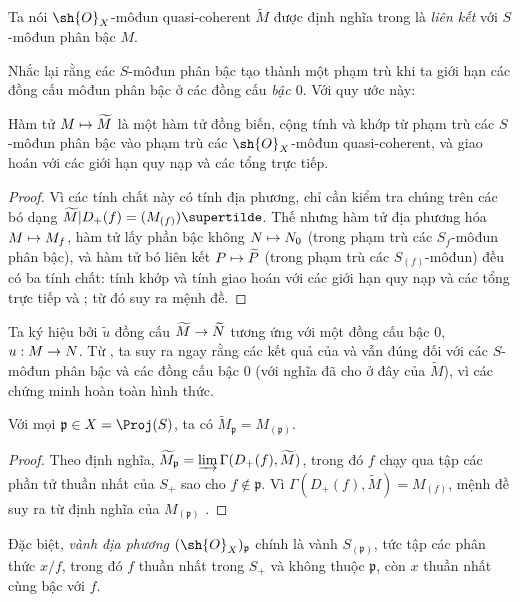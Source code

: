 \documentclass[oneside,10pt]{amsart}
\makeatletter
\newcommand{\ega@arrow}[2]{\mathchoice{#1}{#2}{#2}{#2}}
\let\ega@shortmapsto\mapsto
\renewcommand{\to}{\ega@arrow{\longrightarrow}{\rightarrow}}
\renewcommand{\mapsto}{\ega@arrow{\longmapsto}{\ega@shortmapsto}}
\newcommand{\oldpage}[2][]{\marginnote{\normalfont\footnotesize\textbf{#1}~|~#2}\ignorespaces}
\let\EGAOriginalLabel\label
\renewcommand{\label}[1]{\phantomsection\EGAOriginalLabel{#1}}
\makeatother
\begin{document}
\begin{definition}[2.5.3]
\label{II.2.5.3}
Ta nói $\sh{O}_X$-môđun quasi-coherent $\widetilde{M}$ được định nghĩa trong  là \emph{liên kết} với $S$-môđun phân bậc $M$.
\end{definition}

Nhắc lại rằng các $S$-môđun phân bậc tạo thành một phạm trù khi ta giới hạn các đồng cấu môđun phân bậc ở các đồng cấu \emph{bậc $0$}.
Với quy ước này:

\begin{proposition}[2.5.4]
\label{II.2.5.4}
Hàm tử $M\mapsto\widetilde{M}$ là một hàm tử đồng biến, cộng tính và khớp từ phạm trù các $S$-môđun phân bậc vào phạm trù các $\sh{O}_X$-môđun quasi-coherent, và giao hoán với các giới hạn quy nạp và các tổng trực tiếp.
\end{proposition}

\begin{proof}
Vì các tính chất này có tính địa phương, chỉ cần kiểm tra chúng trên các bó dạng $\widetilde{M}|D_+(f)=(M_{(f)})\supertilde$.
Thế nhưng hàm tử địa phương hóa $M\mapsto M_f$, hàm tử lấy phần bậc không $N\mapsto N_0$ (trong phạm trù các $S_f$-môđun phân bậc), và hàm tử bó liên kết $P\mapsto\widetilde{P}$ (trong phạm trù các $S_{(f)}$-môđun) đều có ba tính chất: tính khớp và tính giao hoán với các giới hạn quy nạp và các tổng trực tiếp  và ; từ đó suy ra mệnh đề.
\end{proof}

Ta ký hiệu bởi $\widetilde{u}$ đồng cấu $\widetilde{M}\to\widetilde{N}$ tương ứng với một đồng cấu bậc $0$, $u:M\to N$.
Từ , ta suy ra ngay rằng các kết quả của  và  vẫn đúng đối với các $S$-môđun phân bậc và các đồng cấu bậc $0$ (với nghĩa đã cho ở đây của $\widetilde{M}$), vì các chứng minh hoàn toàn hình thức.

\begin{proposition}[2.5.5]
\label{II.2.5.5}
Với mọi $\mathfrak{p}\in X=\Proj(S)$, ta có $\widetilde{M}_\mathfrak{p}=M_{(\mathfrak{p})}$.
\end{proposition}

\begin{proof}
Theo định nghĩa, $\widetilde{M}_\mathfrak{p}=\varinjlim\Gamma(D_+(f),\widetilde{M})$, trong đó $f$ chạy qua tập các phần tử thuần nhất của $S_+$ sao cho $f\notin\mathfrak{p}$.
Vì $\Gamma(D_+(f),\widetilde{M})=M_{(f)}$, mệnh đề suy ra từ định nghĩa của $M_{(\mathfrak{p})}$ .
\end{proof}
\oldpage[II]{32}
Đặc biệt, \emph{vành địa phương $(\sh{O}_X)_\mathfrak{p}$} chính là vành $S_{(\mathfrak{p})}$, tức tập các phân thức $x/f$, trong đó $f$ thuần nhất trong $S_+$ và không thuộc $\mathfrak{p}$, còn $x$ thuần nhất cùng bậc với $f$.
\end{document}
